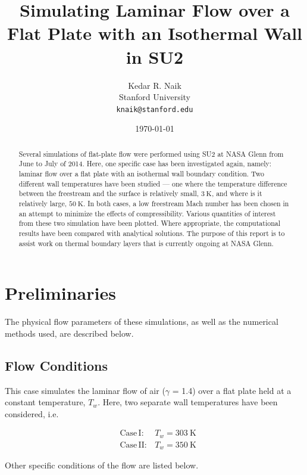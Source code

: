 \documentclass[12pt,letterpaper]{article}
\begin{document}
\title{Simulating Laminar Flow over a Flat Plate with an Isothermal Wall in SU2}
\author{Kedar R. Naik \\
 Stanford University \\
 \texttt{knaik@stanford.edu}}
\date{\today}
\maketitle

\begin{abstract}
Several simulations of flat-plate flow were performed using SU2 at NASA Glenn from June to July of 2014. Here, one specific case has been investigated again, namely: laminar flow over a flat plate with an isothermal wall boundary condition. Two different wall temperatures have been studied --- one where the temperature difference between the freestream and the surface is relatively small, $\SI{3}{\kelvin}$, and  where is it relatively large, $\SI{50}{\kelvin}$. In both cases, a low freestream Mach number has been chosen in an attempt to minimize the effects of compressibility. Various quantities of interest from these two simulation have been plotted. Where appropriate, the computational results have been compared with analytical solutions. The purpose of this report is to assist work on thermal boundary layers that is currently ongoing at NASA Glenn.
\end{abstract}

\section*{Preliminaries}
The physical flow parameters of these simulations, as well as the numerical methods used, are described below.

\subsection*{Flow Conditions}
This case simulates the laminar flow of air ($\gamma$ = 1.4) over a flat plate held at a constant temperature, $T_w$. Here, two separate wall temperatures have been considered, i.e.

\begin{align*}
&\mathrm{Case \, I}: & T_w = \SI{303}{\kelvin} \\
&\mathrm{Case \, II}: & T_w = \SI{350}{\kelvin}
\end{align*}

Other specific conditions of the flow are listed below.
\end{document}
